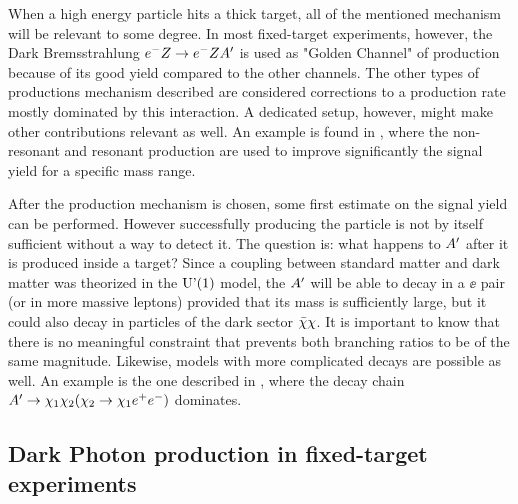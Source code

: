 When a high energy particle hits a thick target, all of the mentioned mechanism will be relevant to some degree. %
In most fixed-target experiments, however, the Dark Bremsstrahlung $e^- Z \to e^- Z A'$ is used as "Golden Channel" of production because of its good yield compared to the other channels. The other types of productions mechanism described are considered corrections to a production rate mostly dominated by this interaction. A dedicated setup, however, might make other contributions relevant as well. An example is found in \cite{Marsicano_2018}, where the non-resonant and resonant production are used to improve significantly the signal yield for a specific mass range.

After the production mechanism is chosen, some first estimate on the signal yield can be performed. However successfully producing the particle is not by itself sufficient without a way to detect it. The question is: what happens to $A'$ after it is produced inside a target? Since a coupling between standard matter and dark matter was theorized in the $\textrm{U'(1)}$ model, the $A'$ will be able to decay in a $\ee$ pair (or in more massive leptons) provided that its mass is sufficiently large, but it could also decay in particles of the dark sector $\bar{\chi} \chi$. It is important to know that there is no meaningful constraint that prevents both branching ratios to be of the same magnitude. Likewise, models with more complicated decays are possible as well. An example is the one described in \cite{Mohlabeng_2019}, where the decay chain $A' \to \chi_1 \chi_2(\chi_2 \to \chi_1 e^+e^-)$ dominates. 

\subsection{Dark Photon production in fixed-target experiments}
\label{ch1:sec:dm-u1model}

